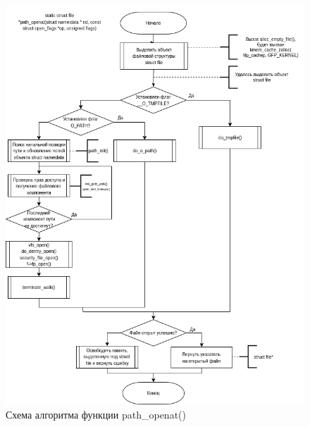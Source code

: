 \begin{figure}[H]
	\centering
	\includegraphics[scale=0.6]{assets/open-path_openat.drawio.png}
	\caption{Схема алгоритма функции path\_openat()}
\end{figure}

